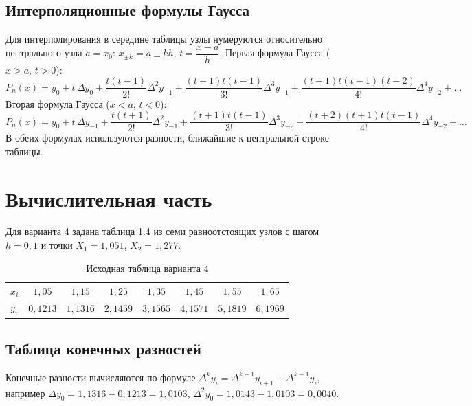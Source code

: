 \documentclass[12pt,a4paper]{article}
\begin{document}
\subsection*{Интерполяционные формулы Гаусса}
Для интерполирования в середине таблицы узлы нумеруются относительно центрального узла $a=x_0$: $x_{\pm k}=a\pm kh$, $t=\dfrac{x-a}{h}$.
Первая формула Гаусса ($x>a$, $t>0$):
\[
    P_n(x)=y_0+t\,\Delta y_0+\frac{t(t-1)}{2!}\Delta^2y_{-1}+\frac{(t+1)t(t-1)}{3!}\Delta^3y_{-1}+\frac{(t+1)t(t-1)(t-2)}{4!}\Delta^4y_{-2}+\ldots
\]
Вторая формула Гаусса ($x<a$, $t<0$):
\[
    P_n(x)=y_0+t\,\Delta y_{-1}+\frac{t(t+1)}{2!}\Delta^2y_{-1}+\frac{(t+1)t(t-1)}{3!}\Delta^3y_{-2}+\frac{(t+2)(t+1)t(t-1)}{4!}\Delta^4y_{-2}+\ldots
\]
В обеих формулах используются разности, ближайшие к центральной строке таблицы.

\section*{Вычислительная часть}
Для варианта 4 задана таблица 1.4 из семи равноотстоящих узлов с шагом $h=0{,}1$ и точки $X_1=1{,}051$, $X_2=1{,}277$.

\begin{table}[H]
    \centering
    \caption{Исходная таблица варианта 4}
    \begin{tabular}{l*{7}{c}}
        \toprule
        $x_i$ & $1{,}05$ & $1{,}15$ & $1{,}25$ & $1{,}35$ & $1{,}45$ & $1{,}55$ & $1{,}65$\\
        $y_i$ & $0{,}1213$ & $1{,}1316$ & $2{,}1459$ & $3{,}1565$ & $4{,}1571$ & $5{,}1819$ & $6{,}1969$\\
        \bottomrule
    \end{tabular}
\end{table}

\subsection*{Таблица конечных разностей}
Конечные разности вычисляются по формуле $\Delta^k y_i=\Delta^{k-1}y_{i+1}-\Delta^{k-1}y_i$, например $\Delta y_0=1{,}1316-0{,}1213=1{,}0103$, $\Delta^2y_0=1{,}0143-1{,}0103=0{,}0040$.
\end{document}
